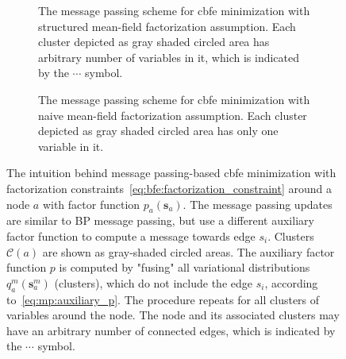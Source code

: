 \begin{figure}
  \centering
  \begin{subfigure}[t]{0.45\textwidth}
    \centering
    \resizebox{\textwidth}{!}{}
    \caption{The message passing scheme for \ac{cbfe} minimization with structured mean-field factorization assumption.
      Each cluster depicted as gray shaded circled area has arbitrary number of variables in it,
      which is indicated by the $\cdots$ symbol.
    }
    \label{fig:mp:vmp_intuition_structured}
  \end{subfigure}
  \hfill
  \begin{subfigure}[t]{0.42\textwidth}
    \centering
    \resizebox{\textwidth}{!}{}
    \caption{The message passing scheme for \ac{cbfe} minimization with naive mean-field factorization assumption.
      Each cluster depicted as gray shaded circled area has only one variable in it.
    }
    \label{fig:mp:vmp_intuition_mean_field}
  \end{subfigure}
  \caption{The intuition behind message passing-based \ac{cbfe} minimization with factorization constraints~\eqref{eq:bfe:factorization_constraint} around a node $a$ with factor function $p_a(\bm{s}_a)$.
    The message passing updates are similar to BP message passing, but use a different auxiliary
    factor function to compute a message towards edge $s_i$.
    Clusters $\mathcal{C}(a)$ are shown as gray-shaded circled areas.
    The auxiliary factor function $p$ is computed by "fusing" all variational distributions
    $q^m_a(\bm{s}^m_a)$ (clusters), which do not include the edge $s_i$, according
    to~\eqref{eq:mp:auxiliary_p}.
    The procedure repeats for all clusters of variables around the node.
    The node and its associated clusters may have an arbitrary number of connected edges, which is
    indicated by the $\cdots$ symbol.
  }
  \label{fig:mp:vmp_intuition}
\end{figure}


